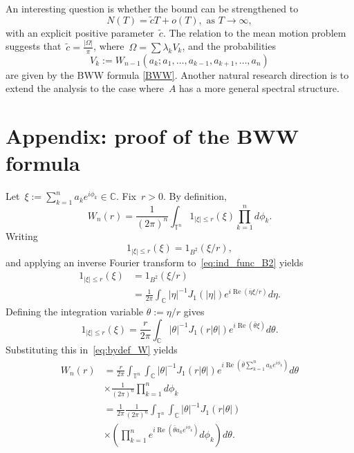 \documentclass[final ]{IEEEtran}
\newcommand {\C}{\mathbb C}
\newcommand {\T}{\mathbb T^n}
\newcommand{\be}{\begin{equation}}
\newcommand{\ee}{\end{equation}}
\renewcommand{\Re}{\operatorname{Re}}
\renewcommand{\Re}{\operatorname{Re}}
\begin{document}
An interesting question is whether the
bound can be strengthened to
\begin{equation}\label{asymp_eq2}
N(T)= \tilde c T+o(T), \text{ as } T\to\infty,
\end{equation}
with an  explicit positive parameter~$\tilde c$.
The relation to the mean motion problem suggests that~$\widetilde c=\frac{|\Omega|}{\pi}$, where~$\Omega=\sum \lambda_k V_k  $, and the probabilities $$V_k:=W_{n-1}(a_k;a_1,\dots,a_{k-1},a_{k+1},\dots,a_n)$$ are given by the BWW formula \eqref{BWW}.
Another natural research direction is to extend the analysis to the case where~$A$ has  a more general spectral structure.  


 \section*{Appendix: proof of the BWW formula }
Let~$\xi:=\sum_{k=1}^n  a_ke^{i\phi_k}\in \C$.
Fix~$r>0$.
By definition,
\be\label{eq:bydef_W}
W_n(r)=\frac1{(2\pi)^n}\int_{\T} 1_{|\xi|\leq r}(\xi)  \prod_{k=1}^n d\phi_k . 
\ee
Writing
\begin{equation}
1_{|\xi|\leq r}(\xi)=1_{B^2}(\xi/r),
\end{equation}
and applying an inverse Fourier transform to~\eqref{eq:ind_func_B2} yields
\begin{align*}
1_{|\xi|\leq r}(\xi)&=1_{B^2}(\xi/r)\\&=\frac{1}{2\pi}\int_\C |\eta|^{-1} J_1(|\eta|)e^{i\Re  (\bar\eta \xi/r )} d\eta .
\end{align*}
Defining the integration variable
  $\theta:=\eta/r$ gives
\begin{equation}
1_{|\xi|\leq r}(\xi)= \frac{r}{2\pi}\int_\C |\theta|^{-1} J_1(r|\theta|)e^{i\Re  (\bar\theta \xi )} d\theta.
\end{equation}
Substituting  this in~\eqref{eq:bydef_W} yields
\begin{align*}
W_n(r)&=\frac{r}{ 2\pi }\int_{\T}  \int_\C |\theta|^{-1} J_1(r|\theta|)e^{i\Re  (\bar\theta \sum_{k=1}^n a_ke^{i\phi_k}  )} d\theta\\&\times \frac1{(2\pi)^n} \prod_{k=1}^n d\phi_k\\
&= \frac{1}{ 2\pi }\frac{1}{(2\pi)^n}\int_{\T}  \int_\C |\theta|^{-1} J_1(r|\theta|)\\&\times
\left (  \prod_{k=1}^n e^{i\Re  (\bar\theta  a_k e^{i\phi_k}  )}d\phi_k\right)  d\theta  .
\end{align*}
\end{document}
